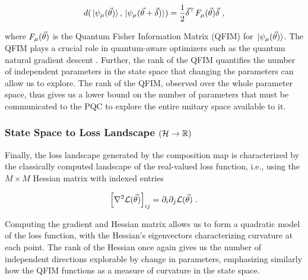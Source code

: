 \begin{equation}
    d(\ket*{\psi_\mu (\vec{\theta})}, \ket*{\psi_\mu(\vec{\theta} + \vec{\delta})}) 
        = \frac{1}{2} \vec{\delta}^\top F_\mu(\vec{\theta}) \vec{\delta}~,
\end{equation}

where \(F_\mu(\vec{\theta})\) is the Quantum Fisher Information Matrix (QFIM) for
\(\ket*{\psi_\mu(\vec{\theta})}\). The QFIM plays a crucial role in quantum-aware
optimizers such as the quantum natural gradient descent
\cite{stokes2020quantum,koczor2019quantum,gacon2021simultaneous,haug2021natural}.
Further, the rank of the QFIM quantifies the number of independent parameters in
the state space that changing the parameters can allow us to explore. The rank
of the QFIM, observed over the whole parameter space, thus gives us a lower
bound on the number of parameters that must be communicated to the PQC to
explore the entire unitary space available to it.

\subsubsection{State Space to Loss Landscape \((\mathcal{H} \to \mathbb{R})\)}

Finally, the loss landscape generated by the composition map is characterized by
the classically computed landscape of the real-valued loss function, i.e., using
the \(M\times M\) Hessian matrix with indexed entries

\begin{equation}
    \left[\nabla^2 \mathcal{L}(\vec{\theta}) \right]_{ij} = \partial_i\partial_j \mathcal{L}(\vec{\theta})~.
\end{equation}

Computing the gradient and Hessian matrix allows us to form a quadratic model of
the loss function, with the Hessian's eigenvectors characterizing curvature at
each point. The rank of the Hessian once again gives us the number of
independent directions explorable by change in parameters, emphasizing similarly
how the QFIM functions as a measure of curvature in the state space.
